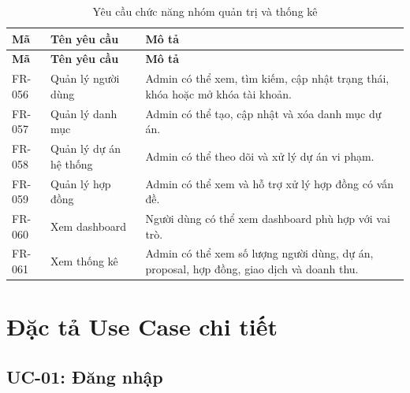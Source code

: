 \begin{longtable}{|p{2.0cm}|p{4.2cm}|p{7.6cm}|}
\caption{Yêu cầu chức năng nhóm quản trị và thống kê}
\label{tab:fr-administration} \\ \hline
\textbf{Mã} & \textbf{Tên yêu cầu} & \textbf{Mô tả} \\ \hline
\endfirsthead
\hline
\textbf{Mã} & \textbf{Tên yêu cầu} & \textbf{Mô tả} \\ \hline
\endhead

FR-056 & Quản lý người dùng & Admin có thể xem, tìm kiếm, cập nhật trạng thái, khóa hoặc mở khóa tài khoản. \\ \hline
FR-057 & Quản lý danh mục & Admin có thể tạo, cập nhật và xóa danh mục dự án. \\ \hline
FR-058 & Quản lý dự án hệ thống & Admin có thể theo dõi và xử lý dự án vi phạm. \\ \hline
FR-059 & Quản lý hợp đồng & Admin có thể xem và hỗ trợ xử lý hợp đồng có vấn đề. \\ \hline
FR-060 & Xem dashboard & Người dùng có thể xem dashboard phù hợp với vai trò. \\ \hline
FR-061 & Xem thống kê & Admin có thể xem số lượng người dùng, dự án, proposal, hợp đồng, giao dịch và doanh thu. \\ \hline
\end{longtable}

\section{Đặc tả Use Case chi tiết}
\label{sec:usecase-specifications}

\subsection{UC-01: Đăng nhập}

